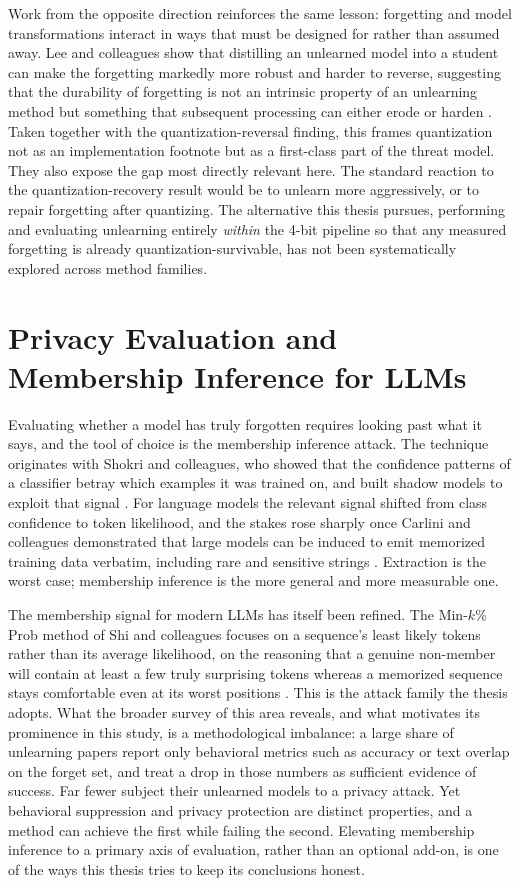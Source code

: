 \documentclass[a4paper,12pt]{report}
\begin{document}
Work from the opposite direction reinforces the same lesson: forgetting and model transformations interact in ways that must be designed for rather than assumed away. Lee and colleagues show that distilling an unlearned model into a student can make the forgetting markedly more robust and harder to reverse, suggesting that the durability of forgetting is not an intrinsic property of an unlearning method but something that subsequent processing can either erode or harden \parencite{lee2025distillation}. Taken together with the quantization-reversal finding, this frames quantization not as an implementation footnote but as a first-class part of the threat model. They also expose the gap most directly relevant here. The standard reaction to the quantization-recovery result would be to unlearn more aggressively, or to repair forgetting after quantizing. The alternative this thesis pursues, performing and evaluating unlearning entirely \emph{within} the 4-bit pipeline so that any measured forgetting is already quantization-survivable, has not been systematically explored across method families.

\section{Privacy Evaluation and Membership Inference for LLMs}
Evaluating whether a model has truly forgotten requires looking past what it says, and the tool of choice is the membership inference attack. The technique originates with Shokri and colleagues, who showed that the confidence patterns of a classifier betray which examples it was trained on, and built shadow models to exploit that signal \parencite{shokri2017mia}. For language models the relevant signal shifted from class confidence to token likelihood, and the stakes rose sharply once Carlini and colleagues demonstrated that large models can be induced to emit memorized training data verbatim, including rare and sensitive strings \parencite{carlini2021extracting}. Extraction is the worst case; membership inference is the more general and more measurable one.

The membership signal for modern LLMs has itself been refined. The Min-$k$\% Prob method of Shi and colleagues focuses on a sequence's least likely tokens rather than its average likelihood, on the reasoning that a genuine non-member will contain at least a few truly surprising tokens whereas a memorized sequence stays comfortable even at its worst positions \parencite{shi2024minkprob}. This is the attack family the thesis adopts. What the broader survey of this area reveals, and what motivates its prominence in this study, is a methodological imbalance: a large share of unlearning papers report only behavioral metrics such as accuracy or text overlap on the forget set, and treat a drop in those numbers as sufficient evidence of success. Far fewer subject their unlearned models to a privacy attack. Yet behavioral suppression and privacy protection are distinct properties, and a method can achieve the first while failing the second. Elevating membership inference to a primary axis of evaluation, rather than an optional add-on, is one of the ways this thesis tries to keep its conclusions honest.
\end{document}
